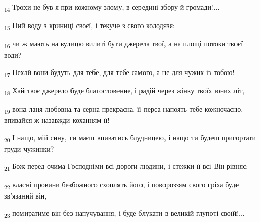 \begin{tcolorbox}
\textsubscript{14} Трохи не був я при кожному злому, в середині збору й громади!...
\end{tcolorbox}
\begin{tcolorbox}
\textsubscript{15} Пий воду з криниці своєї, і текуче з свого колодязя:
\end{tcolorbox}
\begin{tcolorbox}
\textsubscript{16} чи ж мають на вулицю вилиті бути джерела твої, а на площі потоки твоєї води?
\end{tcolorbox}
\begin{tcolorbox}
\textsubscript{17} Нехай вони будуть для тебе, для тебе самого, а не для чужих із тобою!
\end{tcolorbox}
\begin{tcolorbox}
\textsubscript{18} Хай твоє джерело буде благословенне, і радій через жінку твоїх юних літ,
\end{tcolorbox}
\begin{tcolorbox}
\textsubscript{19} вона ланя любовна та серна прекрасна, її перса напоять тебе кожночасно, впивайся ж назавжди коханням її!
\end{tcolorbox}
\begin{tcolorbox}
\textsubscript{20} І нащо, мій сину, ти маєш впиватись блудницею, і нащо ти будеш пригортати груди чужинки?
\end{tcolorbox}
\begin{tcolorbox}
\textsubscript{21} Бож перед очима Господніми всі дороги людини, і стежки її всі Він рівняє:
\end{tcolorbox}
\begin{tcolorbox}
\textsubscript{22} власні провини безбожного схоплять його, і повороззям свого гріха буде зв'язаний він,
\end{tcolorbox}
\begin{tcolorbox}
\textsubscript{23} помиратиме він без напучування, і буде блукати в великій глупоті своїй!...
\end{tcolorbox}
